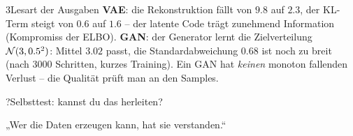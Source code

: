 \begin{hngrid}
%
%
\begin{hnp}[raster multicolumn=6,acc=hnteal]{3}{Lesart der Ausgaben}
\textbf{VAE}: die Rekonstruktion fällt von $9.8$ auf $2.3$, der KL-Term steigt von $0.6$ auf $1.6$ -- der latente Code trägt zunehmend Information (Kompromiss der ELBO). \textbf{GAN}: der Generator lernt die Zielverteilung $\mathcal{N}(3,0.5^2)$: Mittel $3.02$ passt, die Standardabweichung $0.68$ ist noch zu breit (nach $3000$ Schritten, kurzes Training). Ein GAN hat \emph{keinen} monoton fallenden Verlust -- die Qualität prüft man an den Samples.
\end{hnp}
%
\begin{hnp}[raster multicolumn=6,acc=hnpurple,colback=hnlilac!30]{?}{Selbsttest: kannst du das herleiten?}
\end{hnp}
%
\begin{hnbanner}[raster multicolumn=6]
„Wer die Daten erzeugen kann, hat sie verstanden.“
\end{hnbanner}
\end{hngrid}
